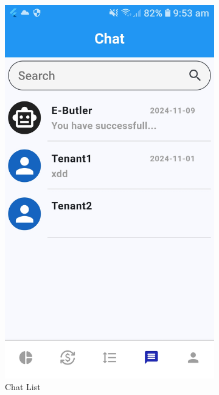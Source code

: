 \documentclass[sigconf,nonacm]{acmart}\settopmatter{printfolios=true}
\begin{document}
\begin{figure}[htbp]
  \centering
  \begin{subfigure}{0.24\textwidth}
    \includegraphics[width=\textwidth]{chatList.jpg}
    \caption{Chat List}
    \label{fig:chatList}
  \end{subfigure}
  \begin{subfigure}{0.24\textwidth}

\end{subfigure}
\end{figure}
\end{document}
